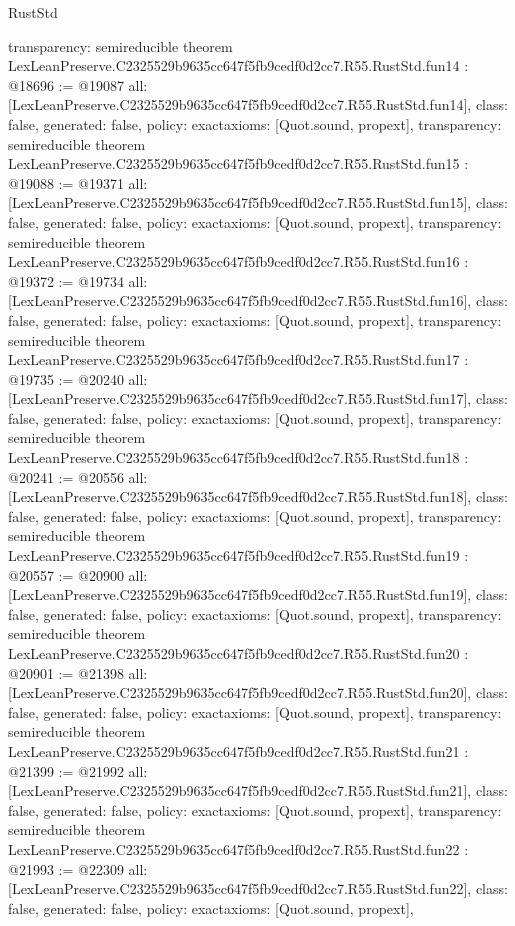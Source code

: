 \begin{lexlean}{RustStd}
\begin{coremodule}
{  transparency: semireducible
}
theorem LexLeanPreserve.C2325529b9635cc647f5fb9cedf0d2cc7.R55.RustStd.fun14 : @18696 := @19087 {
  all: [LexLeanPreserve.C2325529b9635cc647f5fb9cedf0d2cc7.R55.RustStd.fun14],
  class: false,
  generated: false,
  policy: exact{axioms: [Quot.sound, propext]},
  transparency: semireducible
}
theorem LexLeanPreserve.C2325529b9635cc647f5fb9cedf0d2cc7.R55.RustStd.fun15 : @19088 := @19371 {
  all: [LexLeanPreserve.C2325529b9635cc647f5fb9cedf0d2cc7.R55.RustStd.fun15],
  class: false,
  generated: false,
  policy: exact{axioms: [Quot.sound, propext]},
  transparency: semireducible
}
theorem LexLeanPreserve.C2325529b9635cc647f5fb9cedf0d2cc7.R55.RustStd.fun16 : @19372 := @19734 {
  all: [LexLeanPreserve.C2325529b9635cc647f5fb9cedf0d2cc7.R55.RustStd.fun16],
  class: false,
  generated: false,
  policy: exact{axioms: [Quot.sound, propext]},
  transparency: semireducible
}
theorem LexLeanPreserve.C2325529b9635cc647f5fb9cedf0d2cc7.R55.RustStd.fun17 : @19735 := @20240 {
  all: [LexLeanPreserve.C2325529b9635cc647f5fb9cedf0d2cc7.R55.RustStd.fun17],
  class: false,
  generated: false,
  policy: exact{axioms: [Quot.sound, propext]},
  transparency: semireducible
}
theorem LexLeanPreserve.C2325529b9635cc647f5fb9cedf0d2cc7.R55.RustStd.fun18 : @20241 := @20556 {
  all: [LexLeanPreserve.C2325529b9635cc647f5fb9cedf0d2cc7.R55.RustStd.fun18],
  class: false,
  generated: false,
  policy: exact{axioms: [Quot.sound, propext]},
  transparency: semireducible
}
theorem LexLeanPreserve.C2325529b9635cc647f5fb9cedf0d2cc7.R55.RustStd.fun19 : @20557 := @20900 {
  all: [LexLeanPreserve.C2325529b9635cc647f5fb9cedf0d2cc7.R55.RustStd.fun19],
  class: false,
  generated: false,
  policy: exact{axioms: [Quot.sound, propext]},
  transparency: semireducible
}
theorem LexLeanPreserve.C2325529b9635cc647f5fb9cedf0d2cc7.R55.RustStd.fun20 : @20901 := @21398 {
  all: [LexLeanPreserve.C2325529b9635cc647f5fb9cedf0d2cc7.R55.RustStd.fun20],
  class: false,
  generated: false,
  policy: exact{axioms: [Quot.sound, propext]},
  transparency: semireducible
}
theorem LexLeanPreserve.C2325529b9635cc647f5fb9cedf0d2cc7.R55.RustStd.fun21 : @21399 := @21992 {
  all: [LexLeanPreserve.C2325529b9635cc647f5fb9cedf0d2cc7.R55.RustStd.fun21],
  class: false,
  generated: false,
  policy: exact{axioms: [Quot.sound, propext]},
  transparency: semireducible
}
theorem LexLeanPreserve.C2325529b9635cc647f5fb9cedf0d2cc7.R55.RustStd.fun22 : @21993 := @22309 {
  all: [LexLeanPreserve.C2325529b9635cc647f5fb9cedf0d2cc7.R55.RustStd.fun22],
  class: false,
  generated: false,
  policy: exact{axioms: [Quot.sound, propext]},
}
\end{coremodule}
\end{lexlean}
